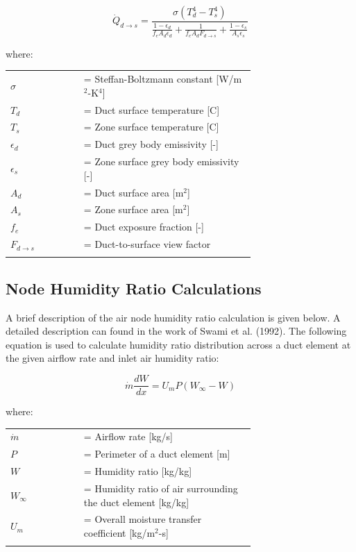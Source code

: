 \begin{equation}
\dot{Q}_{d\rightarrow s} = \frac{\sigma (T^4_d - T^4_s)}{\frac{1 - \epsilon_d}{f_e A_d \epsilon_d} + \frac{1}{f_e A_d F_{d\rightarrow s}}+\frac{1 - \epsilon_s}{A_s \epsilon_s}}
\end{equation}

where:

\begin{tabular}{lp{0.7\linewidth}}
\\
$\sigma$ &= Steffan-Boltzmann constant [W/m\(^{2}\)-K\(^{4}\)] \\
$T_d$ &= Duct surface temperature [C] \\
$T_s$ &= Zone surface temperature [C] \\ 
$\epsilon_d$ &= Duct grey body emissivity [-] \\
$\epsilon_s$ &= Zone surface grey body emissivity [-] \\
$A_d$ &= Duct surface area [m\(^{2}\)] \\
$A_s$ &= Zone surface area [m\(^{2}\)] \\
$f_e$ &= Duct exposure fraction [-] \\
$F_{d\rightarrow s}$ &= Duct-to-surface view factor \\
\\
\end{tabular}

\subsection{Node Humidity Ratio Calculations}\label{node-humidity-ratio-calculations}

A brief description of the air node humidity ratio calculation is given below. A detailed description can found in the work of Swami et al. (1992). The following equation is used to calculate humidity ratio distribution across a duct element at the given airflow rate and inlet air humidity ratio:

\begin{equation}
\dot{m} \frac{dW}{dx} = U_m P(W_\infty - W)
\end{equation}

where:

\begin{tabular}{lp{0.7\linewidth}}
\\
$\dot{m}$ &= Airflow rate [kg/s]\\
$P$ &= Perimeter of a duct element [m]\\
$W$ &= Humidity ratio [kg/kg]\\
$W_\infty$ &= Humidity ratio of air surrounding the duct element [kg/kg]\\
$U_m$ &= Overall moisture transfer coefficient [kg/m\(^{2}\)-s]\\
\\
\end{tabular}

